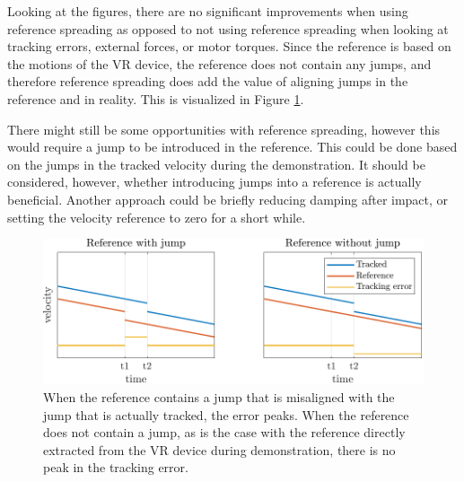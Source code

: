 \documentclass[11pt]{report}
\numberwithin{equation}{section}        %
\numberwithin{figure}{section}          %
\numberwithin{table}{section}           %
\begin{document}
  Looking at the figures, there are no significant improvements when using reference spreading as opposed to not using reference spreading when looking at tracking errors, external forces, or motor torques. Since the reference is based on the motions of the VR device, the reference does not contain any jumps, and therefore reference spreading does add the value of aligning jumps in the reference and in reality. This is visualized in Figure \ref{fig:RSvive}.

  There might still be some opportunities with reference spreading, however this would require a jump to be introduced in the reference. This could be done based on the jumps in the tracked velocity during the demonstration. It should be considered, however, whether introducing jumps into a reference is actually beneficial. Another approach could be briefly reducing damping after impact, or setting the velocity reference to zero for a short while.


\vfill
    \begin{figure}[!h]
  \centering
  \begin{adjustwidth}{0pt}{5pt}
  \includegraphics[right]{Graphics/RSvive.pdf}
  \end{adjustwidth}
  \caption{When the reference contains a jump that is misaligned with the jump that is actually tracked, the error peaks. When the reference does not contain a jump, as is the case with the reference directly extracted from the VR device during demonstration, there is no peak in the tracking error.}
  \label{fig:RSvive}
  \end{figure}
\end{document}
